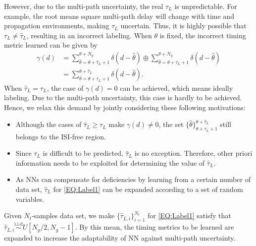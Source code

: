 \documentclass[conference]{IEEEtran}
\begin{document}
However, due to the multi-path uncertainty, the real $\tau_L$ is unpredictable. For example, the root means square multi-path delay will change with time and propagation environments\cite{ref:WCPP}, making $\tau_L$ uncertain. Thus, it is highly possible that $\tau_L\neq\hat \tau_L$, resulting in an incorrect labeling.
When $\theta$ is fixed, the incorrect timing metric learned can be given by
\begin{equation}\label{EQ:ErrLabel1}
\begin{aligned}
\gamma \left( d \right) &= \sum\nolimits_{\hat \theta  = {\theta+{\hat \tau }_L+1}}^{{\theta+N_g}} {\delta \left( {d - \hat \theta } \right)} \oplus \sum\nolimits_{\hat \theta  = {\theta+\tau _L}+1}^{{\theta+N_g}} {\delta \left( {d - \hat \theta } \right)} \\
 &= \sum\nolimits_{\hat \theta  = {\theta+\tau _L+1}}^{{\theta+{\hat \tau }_L}} {\delta \left( {d - \hat \theta } \right)}.
\end{aligned}
\end{equation}
When $\hat{\tau}_L={\tau}_L$, the case of $\gamma \left( d \right)=0$ can be achieved, which means ideally labeling.
Due to the multi-path uncertainty, this case is hardly to be achieved.
Hence, we relax this demand by jointly considering these following motivations:
\begin{itemize}
  \item Although the cases of $\hat{\tau}_L\ge{\tau}_L$ make $\gamma \left( d \right)\neq0$, the set $\{\hat \theta\}^{\theta+\hat \tau_L}_{\theta+\tau_L+1}$ still belongs to the ISI-free region.
  \item Since ${\tau}_L$ is difficult to be predicted, ${\hat \tau}_L$ is no exception. Therefore, other priori information needs to be exploited for determining the value of ${\hat \tau}_L$.
  \item
      As NNs can compensate for deficiencies by learning from a certain number of data set, ${\hat \tau}_L$ for \eqref{EQ:Label1} can be expanded according to a set of random variables.
\end{itemize}
Given $N_t$-samples data set, we make $\{{\hat \tau}_{L,i}\}^{N_t}_{i=1}$ for \eqref{EQ:Label1} satisfy that ${\hat \tau}_{L,i}\mathop \sim \limits^{\textrm{i.i.d}}U[N_g/2, N_g-1]$.
By this mean, the timing metrics to be learned are expanded to increase the adaptability of NN against multi-path uncertainty.
\end{document}
